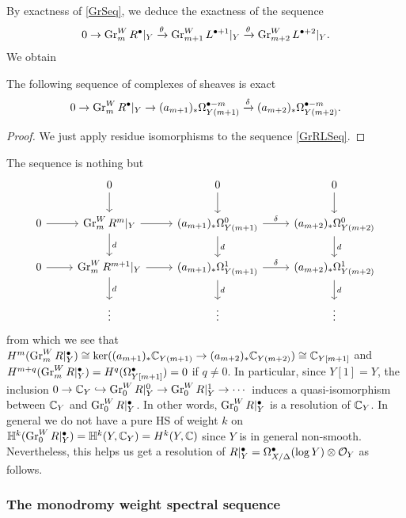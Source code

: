 \documentclass[../main.tex]{subfiles}
\begin{document}
By exactness of \eqref{GrSeq}, we deduce the exactness of the sequence 
\begin{align} \label{GrRLSeq}
0 \to \operatorname{Gr}^W_m R^{\bullet}|_Y \xrightarrow{\theta}  \operatorname{Gr}^W_{m+1} L^{\bullet+1}|_Y \xrightarrow{\theta}  \operatorname{Gr}^W_{m+2} L^{\bullet+2}|_Y.
\end{align}  
We obtain 
\begin{lemma} \label{Lemmaexactsequence}
    The following sequence of complexes of sheaves is exact
\begin{align}
0 \to \operatorname{Gr}^W_m R^{\bullet}|_Y \to (a_{m+1})_* \Omega^{\bullet-m}_{Y(m+1)} \xrightarrow{\delta} (a_{m+2})_* \Omega^{\bullet-m}_{Y(m+2)}. \label{GrOmegaSeq}
\end{align}
\end{lemma}
\begin{proof}
    We just apply residue isomorphisms to the sequence \eqref{GrRLSeq}.
\end{proof} 
The sequence is nothing but
\begin{equation*}
\begin{tikzcd}
 & 0 \arrow[d] & 0 \arrow[d] & 0  \arrow[d]  \\
0 \arrow[r] & \Gr^W_m R^{m}|_Y \arrow[r]   \arrow[d,"d"] & (a_{m+1})_* \Omega^{0}_{Y(m+1)} \arrow[r,"\delta"]  \arrow[d,"d"] & (a_{m+2})_* \Omega^{0}_{Y(m+2)}  \arrow[d,"d"] \\
0 \arrow[r] & \Gr^W_m R^{m+1}|_Y \arrow[r]  \arrow[d,"d"]   & (a_{m+1})_* \Omega^{1}_{Y(m+1)} \arrow[r,"\delta"] \arrow[d,"d"] & (a_{m+2})_* \Omega^{1}_{Y(m+2)} \arrow[d,"d"] \\
 & \vdots & \vdots & \vdots
\end{tikzcd}
\end{equation*}
from which we see that $H^m(\operatorname{Gr}^W_m R|_Y^\bullet) \cong \ker((a_{m+1})_* \mathbb{C}_{Y(m+1)} \to (a_{m+2})_* \mathbb{C}_{Y(m+2)}) \cong \mathbb{C}_{Y[m+1]} $ and $H^{m+q}(\operatorname{Gr}^W_m R|_Y^\bullet)= H^q(\Omega^\bullet_{Y[m+1]})=0$ if $q \neq 0$.
In particular, since $Y[1]=Y$, the inclusion $0 \to \mathbb{C}_Y \hookrightarrow \operatorname{Gr}^W_0 R|_Y^0 \to \operatorname{Gr}^W_0 R|_Y^1 \to \cdots$ induces a quasi-isomorphism between $\mathbb{C}_Y$ and $\operatorname{Gr}^W_0 R|_Y^\bullet$. In other words, $\operatorname{Gr}^W_0 R|_Y^\bullet$ is a resolution of $\mathbb{C}_Y$. In general we do not have a pure HS of weight $k$ on $\mathbb{H}^k(\operatorname{Gr}^W_0 R|_Y^\bullet) = \mathbb{H}^k(Y,\mathbb{C}_Y) = H^k(Y,\mathbb{C})$ since $Y$ is in general non-smooth.
Nevertheless, this helps us get a resolution of $R|_Y^\bullet = 
\Omega^\bullet_{X/\Delta}(\log Y) \otimes \mathcal{O}_Y$ as follows.

\subsubsection{The monodromy weight spectral sequence}
\end{document}
